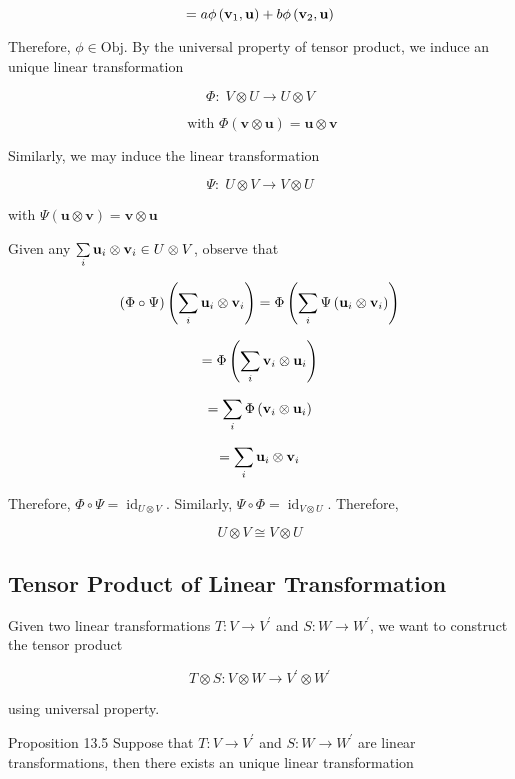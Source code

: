 \documentclass[11pt]{article}
\begin{document}
\[
= {a\phi }\left( {{\bf v}_1,\mathbf{u}}\right)  + {b\phi }\left( {{\bf v}_2,\mathbf{u}}\right)
\]

Therefore, \(\phi  \in  \mathrm{{Obj}}\). By the universal property of tensor product, we induce an unique linear transformation

\[
\Phi  : \;V \otimes  U \rightarrow  U \otimes  V
\]

\[
\text{ with }\Phi \left( {\mathbf{v} \otimes  \mathbf{u}}\right)  = \mathbf{u} \otimes  \mathbf{v}
\]

Similarly, we may induce the linear transformation

\[
\Psi  : \;U \otimes  V \rightarrow  V \otimes  U
\]

with \(\Psi \left( {\mathbf{u} \otimes  \mathbf{v}}\right)  = \mathbf{v} \otimes  \mathbf{u}\)

Given any \(\mathop{\sum }\limits_{i}{\mathbf{u}}_{i} \otimes  {\bf v}_{i} \in  U \otimes  V\), observe that

\[
\left( {\Phi  \circ  \Psi }\right) \left( {\mathop{\sum }\limits_{i}{\mathbf{u}}_{i} \otimes  {\bf v}_{i}}\right)  = \Phi \left( {\mathop{\sum }\limits_{i}\Psi \left( {{\mathbf{u}}_{i} \otimes  {\bf v}_{i}}\right) }\right)
\]

\[
= \Phi \left( {\mathop{\sum }\limits_{i}{\bf v}_{i} \otimes  {\mathbf{u}}_{i}}\right)
\]

\[
= \mathop{\sum }\limits_{i}\Phi \left( {{\bf v}_{i} \otimes  {\mathbf{u}}_{i}}\right)
\]

\[
= \mathop{\sum }\limits_{i}{\mathbf{u}}_{i} \otimes  {\bf v}_{i}
\]

Therefore, \(\Phi  \circ  \Psi  = {\operatorname{id}}_{U \otimes  V}\). Similarly, \(\Psi  \circ  \Phi  = {\operatorname{id}}_{V \otimes  U}\). Therefore,

\[
U \otimes  V \cong  V \otimes  U
\]

\subsection{Tensor Product of Linear Transformation}

Given two linear transformations \(T : V \rightarrow  {V}^{\prime }\) and \(S : W \rightarrow  {W}^{\prime }\), we want to construct the tensor product

\[
T \otimes  S : V \otimes  W \rightarrow  {V}^{\prime } \otimes  {W}^{\prime }
\]

using universal property.

Proposition 13.5 Suppose that \(T : V \rightarrow  {V}^{\prime }\) and \(S : W \rightarrow  {W}^{\prime }\) are linear transformations, then there exists an unique linear transformation
\end{document}
